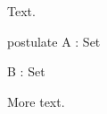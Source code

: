 \documentclass{article}
\begin{document}
\thispagestyle{empty}

Text.
\begin{code}
  postulate
    A  : Set

    B  : Set
\end{code}
More text.
\end{document}
